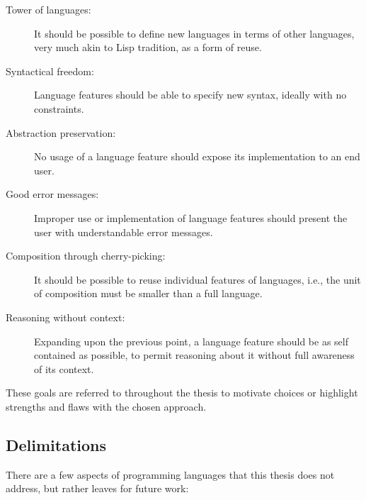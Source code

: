\documentclass{kththesis}
\begin{document}
\begin{description}
  \item[Tower of languages:] It should be possible to define new languages in terms of other languages, very much akin to Lisp tradition, as a form of reuse.
  \item[Syntactical freedom:] Language features should be able to specify new syntax, ideally with no constraints.
  \item[Abstraction preservation:] No usage of a language feature should expose its implementation to an end user.
  \item[Good error messages:] Improper use or implementation of language features should present the user with understandable error messages.
  \item[Composition through cherry-picking:] It should be possible to reuse individual features of languages, i.e., the unit of composition must be smaller than a full language.
  \item[Reasoning without context:] Expanding upon the previous point, a language feature should be as self contained as possible, to permit reasoning about it without full awareness of its context.
\end{description}

These goals are referred to throughout the thesis to motivate choices or highlight strengths and flaws with the chosen approach.

\subsection{Delimitations} \label{sec:delimitations}

There are a few aspects of programming languages that this thesis does not address, but rather leaves for future work:
\end{document}
